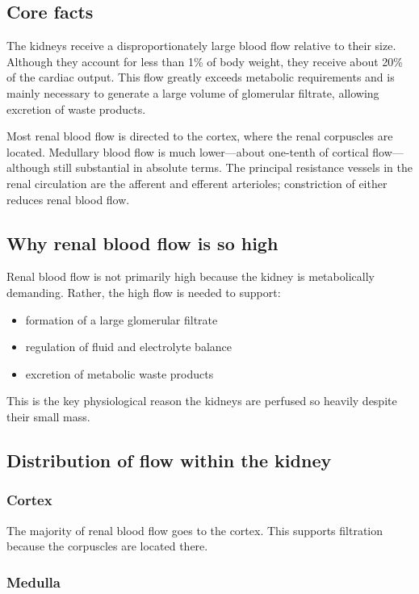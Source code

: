 \documentclass[11pt,a4paper]{article}
\begin{document}
\subsection{Core facts}

The kidneys receive a disproportionately large blood flow relative to their size. Although they account for less than 1\% of body weight, they receive about 20\% of the cardiac output. This flow greatly exceeds metabolic requirements and is mainly necessary to generate a large volume of glomerular filtrate, allowing excretion of waste products.

Most renal blood flow is directed to the cortex, where the renal corpuscles are located. Medullary blood flow is much lower---about one-tenth of cortical flow---although still substantial in absolute terms. The principal resistance vessels in the renal circulation are the afferent and efferent arterioles; constriction of either reduces renal blood flow.

\subsection{Why renal blood flow is so high}

Renal blood flow is not primarily high because the kidney is metabolically demanding. Rather, the high flow is needed to support:
\begin{itemize}
    \item formation of a large glomerular filtrate
    \item regulation of fluid and electrolyte balance
    \item excretion of metabolic waste products
\end{itemize}

This is the key physiological reason the kidneys are perfused so heavily despite their small mass.

\subsection{Distribution of flow within the kidney}

\subsubsection{Cortex}

The majority of renal blood flow goes to the cortex. This supports filtration because the corpuscles are located there.

\subsubsection{Medulla}
\end{document}

